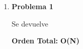 \vspace*{1em}
\begin{enumerate}

\item\textbf{Problema 1}
\par Se devuelve
\par \textbf{Orden Total:} \textbf{O(N)}

\end{enumerate}
